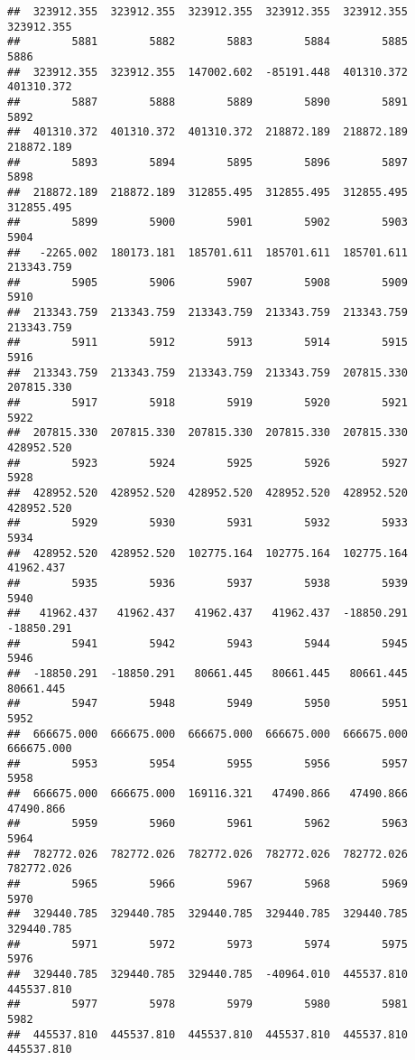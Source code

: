 \documentclass[
]{book}
\begin{document}
\begin{verbatim}
##  323912.355  323912.355  323912.355  323912.355  323912.355  323912.355 
##        5881        5882        5883        5884        5885        5886 
##  323912.355  323912.355  147002.602  -85191.448  401310.372  401310.372 
##        5887        5888        5889        5890        5891        5892 
##  401310.372  401310.372  401310.372  218872.189  218872.189  218872.189 
##        5893        5894        5895        5896        5897        5898 
##  218872.189  218872.189  312855.495  312855.495  312855.495  312855.495 
##        5899        5900        5901        5902        5903        5904 
##   -2265.002  180173.181  185701.611  185701.611  185701.611  213343.759 
##        5905        5906        5907        5908        5909        5910 
##  213343.759  213343.759  213343.759  213343.759  213343.759  213343.759 
##        5911        5912        5913        5914        5915        5916 
##  213343.759  213343.759  213343.759  213343.759  207815.330  207815.330 
##        5917        5918        5919        5920        5921        5922 
##  207815.330  207815.330  207815.330  207815.330  207815.330  428952.520 
##        5923        5924        5925        5926        5927        5928 
##  428952.520  428952.520  428952.520  428952.520  428952.520  428952.520 
##        5929        5930        5931        5932        5933        5934 
##  428952.520  428952.520  102775.164  102775.164  102775.164   41962.437 
##        5935        5936        5937        5938        5939        5940 
##   41962.437   41962.437   41962.437   41962.437  -18850.291  -18850.291 
##        5941        5942        5943        5944        5945        5946 
##  -18850.291  -18850.291   80661.445   80661.445   80661.445   80661.445 
##        5947        5948        5949        5950        5951        5952 
##  666675.000  666675.000  666675.000  666675.000  666675.000  666675.000 
##        5953        5954        5955        5956        5957        5958 
##  666675.000  666675.000  169116.321   47490.866   47490.866   47490.866 
##        5959        5960        5961        5962        5963        5964 
##  782772.026  782772.026  782772.026  782772.026  782772.026  782772.026 
##        5965        5966        5967        5968        5969        5970 
##  329440.785  329440.785  329440.785  329440.785  329440.785  329440.785 
##        5971        5972        5973        5974        5975        5976 
##  329440.785  329440.785  329440.785  -40964.010  445537.810  445537.810 
##        5977        5978        5979        5980        5981        5982 
##  445537.810  445537.810  445537.810  445537.810  445537.810  445537.810 

\end{verbatim}
\end{document}
